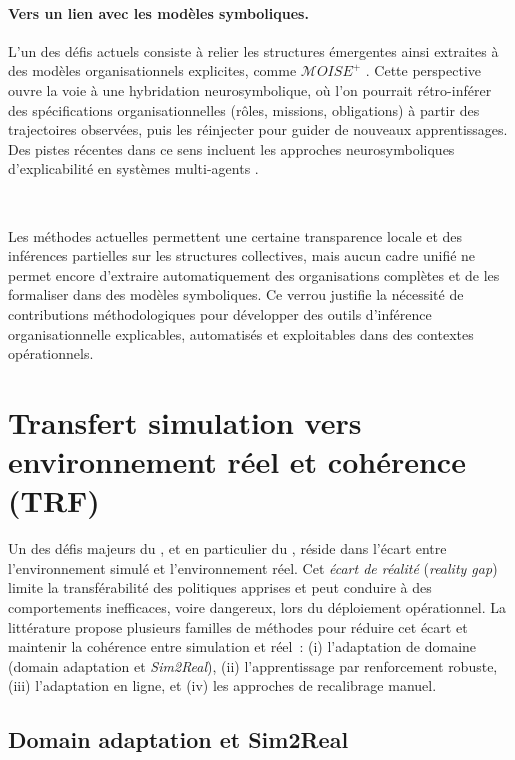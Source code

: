 \paragraph{Vers un lien avec les modèles symboliques.}
L’un des défis actuels consiste à relier les structures émergentes
ainsi extraites à des modèles organisationnels explicites,
comme $\mathcal{M}OISE^+$ \cite{hubner2007using}.
Cette perspective ouvre la voie à une hybridation neurosymbolique,
où l’on pourrait rétro-inférer des spécifications organisationnelles
(rôles, missions, obligations) à partir des trajectoires observées,
puis les réinjecter pour guider de nouveaux apprentissages.
Des pistes récentes dans ce sens incluent les approches neurosymboliques
d’explicabilité en systèmes multi-agents \cite{subramanian2024neurosymbolic}.

\

Les méthodes actuelles permettent une certaine transparence locale
et des inférences partielles sur les structures collectives,
mais aucun cadre unifié ne permet encore
d’extraire automatiquement des organisations complètes
et de les formaliser dans des modèles symboliques.
Ce verrou justifie la nécessité de contributions méthodologiques
pour développer des outils d’inférence organisationnelle
explicables, automatisés et exploitables dans des contextes opérationnels.

\section{Transfert simulation vers environnement réel et cohérence (TRF)}

\noindent
Un des défis majeurs du , et en particulier du , réside dans l’écart
entre l’environnement simulé et l’environnement réel. Cet \textit{écart de réalité}
(\textit{reality gap}) limite la transférabilité des politiques apprises et
peut conduire à des comportements inefficaces, voire dangereux,
lors du déploiement opérationnel. La littérature propose plusieurs familles de méthodes
pour réduire cet écart et maintenir la cohérence entre simulation et réel~:
(i) l’adaptation de domaine (domain adaptation et \textit{Sim2Real}),
(ii) l’apprentissage par renforcement robuste,
(iii) l’adaptation en ligne, et
(iv) les approches de recalibrage manuel.

\subsection{Domain adaptation et Sim2Real}

